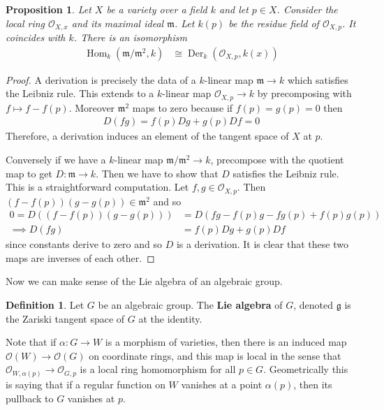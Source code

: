 \documentclass{amsart}
\newcommand{\cO}{{\mathcal{O}}}
\DeclareMathOperator{\Hom}{Hom}
\newcommand{\mf}[1]{\mathfrak{#1}}
\DeclareMathOperator{\Der}{Der}
\numberwithin{equation}{section}
\theoremstyle{plain} %
\newtheorem{proposition}[equation]{Proposition}
\theoremstyle{definition}
\newtheorem{definition}[equation]{Definition}
\theoremstyle{remark}
\begin{document}
\hfill

\begin{proposition}
	Let $X$ be a variety over a field $k$ and let $p\in X$. Consider
    the local ring $\cO_{X,x}$ and its maximal ideal $\mf m$. Let $k(p)$
    be the residue field of $\cO_{X,p}$. It coincides with $k$.
	There is an isomorphism \begin{align*}
		\Hom_k(\mf m/\mf m^2,k) & \cong \Der_k(\cO_{X,p},k(x))
	\end{align*}
\end{proposition}

\begin{proof}
	A derivation is precisely the data of a $k$-linear map $\mf m \to k$ which satisfies the Leibniz rule.
	This extends to a $k$-linear map $\cO_{X,p}\to k$ by precomposing with $f\mapsto f - f(p)$.
	Moreover $\mf m^2$ maps to zero because if $f(p) = g(p) = 0$ then \begin{align*}
		D(fg) = f(p)Dg + g(p)Df = 0
	\end{align*} Therefore, a derivation induces an element of the tangent space of $X$ at $p$.

	\hfill

	Conversely if we have a $k$-linear map $\mf m/\mf m^2\to k$, precompose with the quotient map to get
	$D:\mf m\to k$. Then we have to show that $D$ satisfies the Leibniz rule. This is a straightforward computation.
	Let $f,g\in \cO_{X,p}$. Then $(f-f(p))(g-g(p)) \in \mf m^2$ and so \begin{align*}
		0 = D((f-f(p))(g-g(p))) & = D(fg - f(p)g - fg(p) + f(p)g(p)) \\
		\implies D(fg)          & = f(p)Dg + g(p)Df
	\end{align*} since constants derive to zero and so $D$ is a derivation.
    It is clear that these two maps are inverses of each other.
\end{proof}

Now we can make sense of the Lie algebra of an algebraic group.
\begin{definition}
	Let $G$ be an algebraic group. The \textbf{Lie algebra} of $G$, denoted $\mf g$
	is the Zariski tangent space of $G$ at the identity.
\end{definition}

Note that if $\alpha: G\to W$ is a morphism of varieties, then there is an induced
map $\cO(W) \to \cO(G)$ on coordinate rings, and this map is local in the sense that
$\cO_{W,\alpha(p)}\to \cO_{G,p}$ is a local ring homomorphism for all $p\in G$. Geometrically
this is saying that if a regular function on $W$ vanishes at a point $\alpha(p)$,
then its pullback to $G$ vanishes at $p$.
\end{document}
